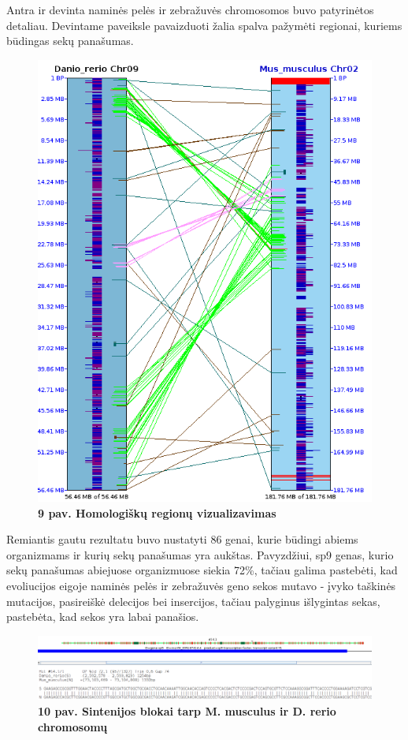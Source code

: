 \documentclass[12pt]{article}
\begin{document}
Antra ir devinta naminės pelės ir zebražuvės chromosomos buvo patyrinėtos
detaliau. Devintame paveiksle pavaizduoti žalia spalva pažymėti regionai,
kuriems būdingas sekų panašumas.

\begin{figure}[htb]
    \begin{center}
        \includegraphics[width=0.4\linewidth]{../Figures/Chr2_9_synteny.png}
        \vspace{-1\baselineskip}
        \caption*{\small\textbf{9 pav. Homologiškų regionų vizualizavimas}}
        \label{fig:birds}
    \end{center}
\end{figure}

\newpage

Remiantis gautu rezultatu buvo nustatyti 86 genai, kurie būdingi abiems
organizmams ir kurių sekų panašumas yra aukštas. Pavyzdžiui, sp9 genas, kurio
sekų panašumas abiejuose organizmuose siekia 72\%, tačiau galima pastebėti, kad
evoliucijos eigoje naminės pelės ir zebražuvės geno sekos mutavo - įvyko
taškinės mutacijos, pasireiškė delecijos bei insercijos, tačiau palyginus
išlygintas sekas, pastebėta, kad sekos yra labai panašios.

\begin{figure}[htb]
    \begin{center}
        \includegraphics[width=1\linewidth]{../Figures/Sp9_gene_alignment.png}
        \vspace{-1\baselineskip}
        \caption*{\small\textbf{10 pav. Sintenijos blokai tarp M. musculus ir D.
        rerio chromosomų}}
        \label{fig:birds}
    \end{center}
\end{figure}
\end{document}
